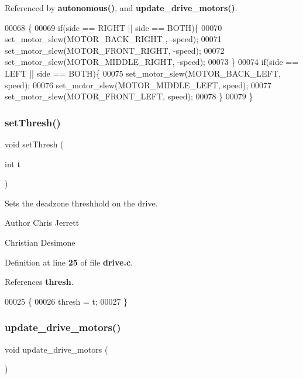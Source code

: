Referenced by \textbf{ autonomous()}, and \textbf{ update\+\_\+drive\+\_\+motors()}.


\begin{DoxyCode}
00068                                            \{
00069   \textcolor{keywordflow}{if}(side == RIGHT || side == BOTH)\{
00070     set_motor_slew(MOTOR_BACK_RIGHT , -speed);
00071     set_motor_slew(MOTOR_FRONT_RIGHT, -speed);
00072     set_motor_slew(MOTOR_MIDDLE_RIGHT, -speed);
00073   \}
00074   \textcolor{keywordflow}{if}(side == LEFT || side == BOTH)\{
00075     set_motor_slew(MOTOR_BACK_LEFT, speed);
00076     set_motor_slew(MOTOR_MIDDLE_LEFT, speed);
00077     set_motor_slew(MOTOR_FRONT_LEFT, speed);
00078   \}
00079 \}
\end{DoxyCode}
\mbox{\label{drive_8h_a53d6e35d53ec3e0b1b1c489d8203f204}} 
\subsubsection{set\+Thresh()}
{\footnotesize\ttfamily void set\+Thresh (\begin{DoxyParamCaption}\item[{int}]{t }\end{DoxyParamCaption})}



Sets the deadzone threshhold on the drive. 

\begin{DoxyAuthor}{Author}
Chris Jerrett

Christian Desimone 
\end{DoxyAuthor}


Definition at line \textbf{ 25} of file \textbf{ drive.\+c}.



References \textbf{ thresh}.


\begin{DoxyCode}
00025                      \{
00026   thresh = t;
00027 \}
\end{DoxyCode}
\mbox{\label{drive_8h_a8224a4626a934d30ed587671b7004bf8}} 
\subsubsection{update\+\_\+drive\+\_\+motors()}
{\footnotesize\ttfamily void update\+\_\+drive\+\_\+motors (\begin{DoxyParamCaption}{ }\end{DoxyParamCaption})}



